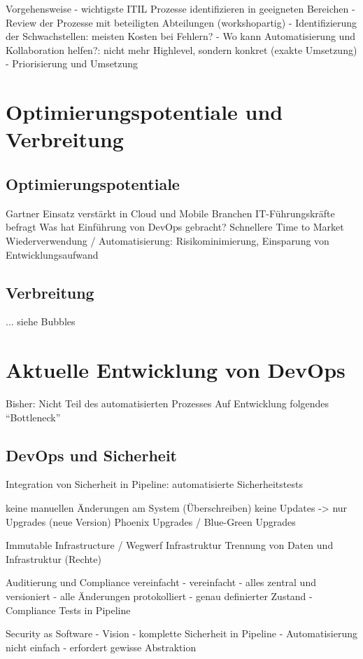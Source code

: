 Vorgehensweise
- wichtigste ITIL Prozesse identifizieren in geeigneten Bereichen
- Review der Prozesse mit beteiligten Abteilungen (workshopartig)
- Identifizierung der Schwachstellen: meisten Kosten bei Fehlern?
- Wo kann Automatisierung und Kollaboration helfen?: nicht mehr Highlevel, sondern konkret (exakte Umsetzung)
- Priorisierung und Umsetzung


\section{Optimierungspotentiale und Verbreitung} %

\subsection{Optimierungspotentiale}
Gartner
Einsatz verstärkt in Cloud und Mobile Branchen
IT-Führungskräfte befragt
Was hat Einführung von DevOps gebracht?
Schnellere Time to Market
Wiederverwendung / Automatisierung: Risikominimierung, Einsparung von Entwicklungsaufwand

\subsection{Verbreitung}
... siehe Bubbles


\section{Aktuelle Entwicklung von DevOps} %
Bisher:
Nicht Teil des automatisierten Prozesses
Auf Entwicklung folgendes “Bottleneck”

\subsection{DevOps und Sicherheit}
Integration von Sicherheit in Pipeline: automatisierte Sicherheitstests

keine manuellen Änderungen am System (Überschreiben)
keine Updates -> nur Upgrades (neue Version)
Phoenix Upgrades / Blue-Green Upgrades

Immutable Infrastructure / Wegwerf Infrastruktur
Trennung von Daten und Infrastruktur (Rechte)

Auditierung und Compliance vereinfacht
- vereinfacht
- alles zentral und versioniert
- alle Änderungen protokolliert
- genau definierter Zustand
- Compliance Tests in Pipeline

Security as Software
- Vision
- komplette Sicherheit in Pipeline
- Automatisierung nicht einfach
- erfordert gewisse Abstraktion



